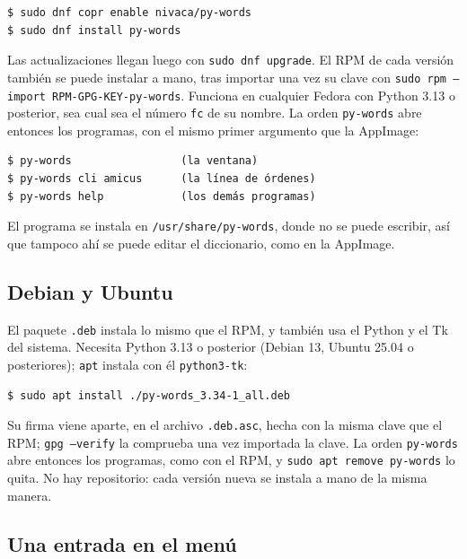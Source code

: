 \documentclass[12pt,
              article,
              oneside
              ]{memoir}
\begin{document}
\begin{verbatim}
$ sudo dnf copr enable nivaca/py-words
$ sudo dnf install py-words
\end{verbatim}

\noindent
Las actualizaciones llegan luego con \texttt{sudo dnf upgrade}. El RPM de
cada versión también se puede instalar a mano, tras importar una vez su
clave con \texttt{sudo rpm --import RPM-GPG-KEY-py-words}. Funciona en
cualquier Fedora con Python 3.13 o posterior, sea cual sea el número
\texttt{fc} de su nombre. La orden \texttt{py-words} abre entonces los
programas, con el mismo primer argumento que la AppImage:

\begin{verbatim}
$ py-words                 (la ventana)
$ py-words cli amicus      (la línea de órdenes)
$ py-words help            (los demás programas)
\end{verbatim}

\noindent{}%
El programa se instala en \texttt{/usr/share/py-words}, donde no se puede
escribir, así que tampoco ahí se puede editar el diccionario, como en la
AppImage.

\subsection{Debian y Ubuntu}

%
El paquete \texttt{.deb} instala lo mismo que el RPM, y también usa el
Python y el Tk del sistema. Necesita Python 3.13 o posterior (Debian 13,
Ubuntu 25.04 o posteriores); \texttt{apt} instala con él
\texttt{python3-tk}:

\begin{verbatim}
$ sudo apt install ./py-words_3.34-1_all.deb
\end{verbatim}

\noindent
Su firma viene aparte, en el archivo \texttt{.deb.asc}, hecha con la misma
clave que el RPM; \texttt{gpg --verify} la comprueba una vez importada la
clave. La orden \texttt{py-words} abre entonces los programas, como con el
RPM, y \texttt{sudo apt remove py-words} lo quita. No hay repositorio:
cada versión nueva se instala a mano de la misma manera.

\subsection{Una entrada en el menú}
\end{document}
